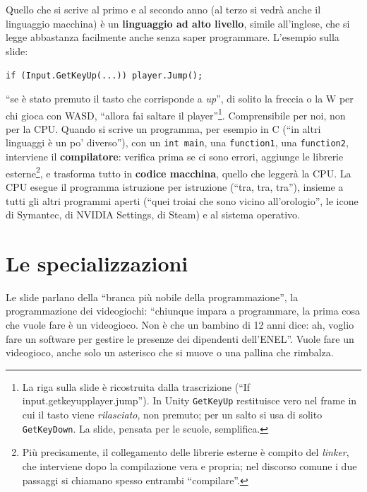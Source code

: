 Quello che si scrive al primo e al secondo anno (al terzo si vedrà anche il
linguaggio macchina) è un \textbf{linguaggio ad alto livello}, simile
all'inglese, che si legge abbastanza facilmente anche senza saper
programmare. L'esempio sulla slide:
\begin{center}
\texttt{if (Input.GetKeyUp(...)) player.Jump();}
\end{center}
``se è stato premuto il tasto che corrisponde a \emph{up}'', di solito la
freccia o la W per chi gioca con WASD, ``allora fai saltare il
player''\footnote{La riga sulla slide è ricostruita dalla trascrizione
(``If input.getkeyupplayer.jump''). In Unity \texttt{GetKeyUp} restituisce
vero nel frame in cui il tasto viene \emph{rilasciato}, non premuto; per un
salto si usa di solito \texttt{GetKeyDown}. La slide, pensata per le scuole,
semplifica.}. Comprensibile per noi, non per la CPU. Quando si scrive un
programma, per esempio in C (``in altri linguaggi è un po' diverso''), con un
\texttt{int main}, una \texttt{function1}, una \texttt{function2},
interviene il \textbf{compilatore}: verifica prima se ci sono errori,
aggiunge le librerie esterne\footnote{Più precisamente, il collegamento delle
librerie esterne è compito del \emph{linker}, che interviene dopo la
compilazione vera e propria; nel discorso comune i due passaggi si chiamano
spesso entrambi ``compilare''.}, e trasforma tutto in \textbf{codice
macchina}, quello che leggerà la CPU. La CPU esegue il programma istruzione
per istruzione (``tra, tra, tra''), insieme a tutti gli altri programmi aperti
(``quei troiai che sono vicino all'orologio'', le icone di Symantec, di NVIDIA
Settings, di Steam) e al sistema operativo.

\section{Le specializzazioni}
\label{p5:sec:specializzazioni}

Le slide parlano della ``branca più nobile della programmazione'', la
programmazione dei videogiochi: ``chiunque impara a programmare, la prima
cosa che vuole fare è un videogioco. Non è che un bambino di 12 anni dice: ah,
voglio fare un software per gestire le presenze dei dipendenti dell'ENEL''.
Vuole fare un videogioco, anche solo un asterisco che si muove o una pallina
che rimbalza.

